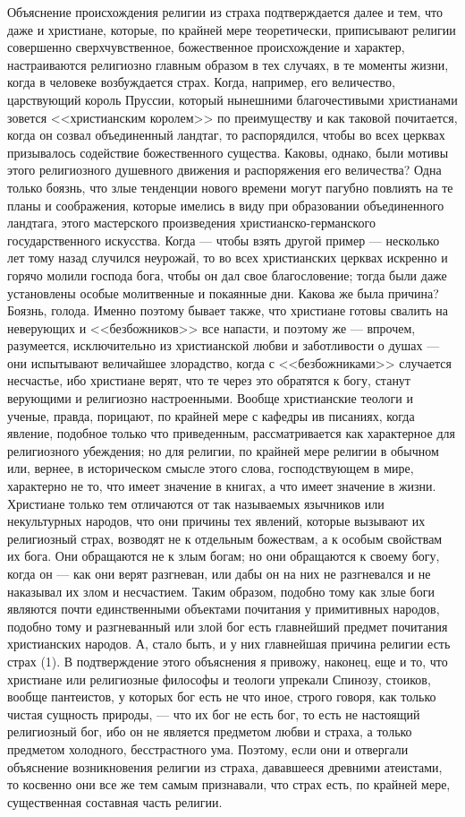 \documentclass[12pt]{article}
\begin{document}
Объяснение происхождения религии из страха подтверждается далее и тем, что даже и христиане, которые, по крайней мере теоретически, приписывают религии совершенно сверхчувственное, божественное происхождение и характер, настраиваются религиозно главным образом в тех случаях, в те моменты жизни, когда в человеке возбуждается страх. Когда, например, его величество, царствующий король Пруссии, который нынешними благочестивыми христианами зовется <<христианским королем>> по преимуществу и как таковой почитается, когда он созвал объединенный ландтаг, то распорядился, чтобы во всех церквах призывалось содействие божественного существа. Каковы, однако, были мотивы этого религиозного душевного движения и распоряжения его величества? Одна только боязнь, что злые тенденции нового времени могут пагубно повлиять на те планы и соображения, которые имелись в виду при образовании объединенного ландтага, этого мастерского произведения христианско-германского государственного искусства. Когда --- чтобы взять другой пример --- несколько лет тому назад случился неурожай, то во всех христианских церквах искренно и горячо молили господа бога, чтобы он дал свое благословение; тогда были даже установлены особые молитвенные и покаянные дни. Какова же была причина? Боязнь, голода. Именно поэтому бывает также, что христиане готовы свалить на неверующих и <<безбожников>> все напасти, и поэтому же --- впрочем, разумеется, исключительно из христианской любви и заботливости о душах --- они испытывают величайшее злорадство, когда с <<безбожниками>> случается несчастье, ибо христиане верят, что те через это обратятся к богу, станут верующими и религиозно настроенными. Вообще христианские теологи и ученые, правда, порицают, по крайней мере с кафедры ив писаниях, когда явление, подобное только что приведенным, рассматривается как характерное для религиозного убеждения; но для религии, по крайней мере религии в обычном или, вернее, в историческом смысле этого слова, господствующем в мире, характерно не то, что имеет значение в книгах, а что имеет значение в жизни. Христиане только тем отличаются от так называемых язычников или некультурных народов, что они причины тех явлений, которые вызывают их религиозный страх, возводят не к отдельным божествам, а к особым свойствам их бога. Они обращаются не к злым богам; но они обращаются к своему богу, когда он --- как они верят разгневан, или дабы он на них не разгневался и не наказывал их злом и несчастием. Таким образом, подобно тому как злые боги являются почти единственными объектами почитания у примитивных народов, подобно тому и разгневанный или злой бог есть главнейший предмет почитания христианских народов. А, стало быть, и у них главнейшая причина религии есть страх (1). В подтверждение этого объяснения я привожу, наконец, еще и то, что христиане или религиозные философы и теологи упрекали Спинозу, стоиков, вообще пантеистов, у которых бог есть не что иное, строго говоря, как только чистая сущность природы, --- что их бог не есть бог, то есть не настоящий религиозный бог, ибо он не является предметом любви и страха, а только предметом холодного, бесстрастного ума. Поэтому, если они и отвергали объяснение возникновения религии из страха, дававшееся древними атеистами, то косвенно они все же тем самым признавали, что страх есть, по крайней мере, существенная составная часть религии. 
\end{document}
